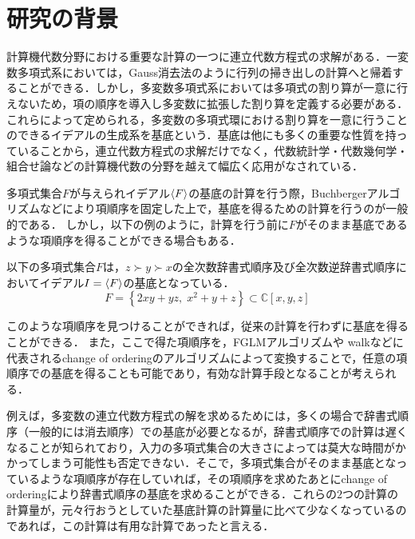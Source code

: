 \nocite{BC04873022}
\nocite{Noro2005ca}
\section{研究の背景}
計算機代数分野における重要な計算の一つに連立代数方程式の求解がある．一変数多項式系においては，Gauss消去法のように行列の掃き出しの計算へと帰着することができる．しかし，多変数多項式系においては多項式の割り算が一意に行えないため，項の順序を導入し多変数に拡張した割り算を定義する必要がある．これらによって定められる，多変数の多項式環における割り算を一意に行うことのできるイデアルの生成系を\groebner{}基底という．\groebner{}基底は他にも多くの重要な性質を持っていることから，連立代数方程式の求解だけでなく，代数統計学・代数幾何学・組合せ論などの計算機代数の分野を越えて幅広く応用がなされている．
\par
多項式集合$F$が与えられイデアル$\langle F \rangle$の\groebner{}基底の計算を行う際，Buchbergerアルゴリズム\cite{buchberger2006bruno}などにより項順序を固定した上で，\groebner{}基底を得るための計算を行うのが一般的である．
しかし，以下の例のように，計算を行う前に$F$がそのまま\groebner{}基底であるような項順序を得ることができる場合もある．
\begin{example}
	以下の多項式集合$F$は，$z \succ y \succ x$の全次数辞書式順序及び全次数逆辞書式順序においてイデアル$I = \langle F \rangle$の\groebner{}基底となっている．
	$$F = \left\{ 2xy + yz, \; x^2 + y + z \right\} \subset \mathbb{C}[x, y, z]$$
\end{example}
このような項順序を見つけることができれば，従来の計算を行わずに\groebner{}基底を得ることができる．
また，ここで得た項順序を，FGLMアルゴリズム\cite{faugere1993efficient}や\groebner{} walk\cite{collart1993grobner}などに代表されるchange of orderingのアルゴリズムによって変換することで，任意の項順序での\groebner{}基底を得ることも可能であり，有効な計算手段となることが考えられる．
\par
例えば，多変数の連立代数方程式の解を求めるためには，多くの場合で辞書式順序（一般的には消去順序）での\groebner{}基底が必要となるが，辞書式順序での計算は遅くなることが知られており，入力の多項式集合の大きさによっては莫大な時間がかかってしまう可能性も否定できない．そこで，多項式集合がそのまま\groebner{}基底となっているような項順序が存在していれば，その項順序を求めたあとにchange of orderingにより辞書式順序の\groebner{}基底を求めることができる．これらの$2$つの計算の計算量が，元々行おうとしていた\groebner{}基底計算の計算量に比べて少なくなっているのであれば，この計算は有用な計算であったと言える．
